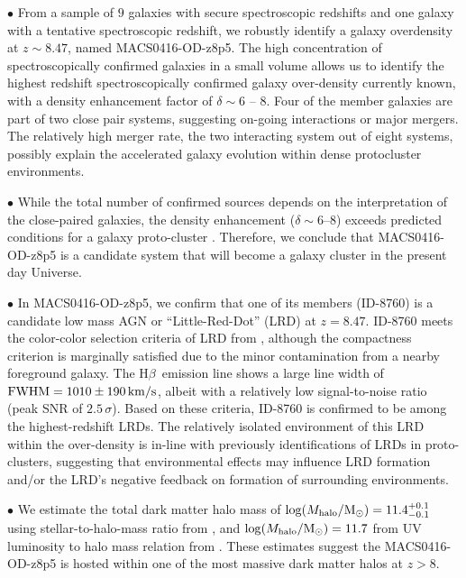 \documentclass[twocolumn]{aastex631}
\def\Hb{H$\beta$}
\def\Hb{H$\beta$}
\begin{document}
\noindent $\bullet$ From a sample of $9$ galaxies with secure spectroscopic redshifts and one galaxy with a tentative spectroscopic redshift, we robustly identify a galaxy overdensity at $z \sim 8.47$, named MACS0416-OD-z8p5.
The high concentration of spectroscopically confirmed galaxies in a small volume allows us to identify the highest redshift spectroscopically confirmed galaxy over-density currently known, with a density enhancement factor of $\delta\sim6$ -- $8$.
Four of the member galaxies are part of two close pair systems, suggesting on-going interactions or major mergers.
The relatively high merger rate, the two interacting system out of eight systems, possibly explain the accelerated galaxy evolution within dense protocluster environments.
\vspace{0.2cm}

\noindent $\bullet$  While the total number of confirmed sources depends on the interpretation of the close-paired galaxies, the density enhancement ($\delta\sim6$--$8$) exceeds predicted conditions for a galaxy proto-cluster \citep{Chiang2013}.
Therefore, we conclude that MACS0416-OD-z8p5 is a candidate system that will become a galaxy cluster in the present day Universe.
\vspace{0.2cm}

\noindent $\bullet$ In MACS0416-OD-z8p5, we confirm that one of its members (ID-8760) is a candidate low mass AGN or ``Little-Red-Dot'' (LRD) at $z=8.47$. ID-8760 meets the color-color selection criteria of LRD from \citet{Greene2024}, although the compactness criterion is marginally satisfied due to the minor contamination from a nearby foreground galaxy. The \Hb\ emission line shows a large line width of ${\rm FWHM}=1010\pm190\,{\rm km/s}$, albeit with a relatively low signal-to-noise ratio (peak SNR of $2.5\,\sigma$). Based on these criteria, ID-8760 is confirmed to be among the highest-redshift LRDs. 
The relatively isolated environment of this LRD within the over-density is in-line with previously identifications of LRDs in proto-clusters, suggesting that environmental effects may influence LRD formation and/or the LRD's negative feedback on formation of surrounding environments.
\vspace{0.2cm}

\noindent $\bullet$ We estimate the total dark matter halo mass of ${\rm log}(M_{\rm halo}/{\rm M_{\odot}})=11.4^{+0.1}_{-0.1}$ using stellar-to-halo-mass ratio from \citet{Behroozi2019}, and ${\rm log}(M_{\rm halo}/{\rm M_{\odot}})=11.7$ from UV luminosity to halo mass relation from \citet{Mason2023}. These estimates suggest the MACS0416-OD-z8p5 is hosted within one of the most massive dark matter halos at $z>8$. 
\vspace{0.2cm}
\end{document}
